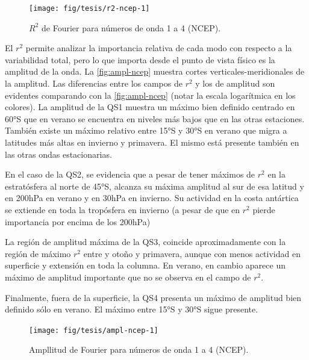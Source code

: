 \documentclass[spanish,a4paper,12pt,oneside]{book}
\begin{document}
\begin{landscape}\begin{figure}

{\centering \texttt{[image: fig/tesis/r2-ncep-1]} 

}

\caption{$R^2$ de Fourier para números de onda 1 a 4 (NCEP).}\label{fig:r2-ncep}
\end{figure}
\end{landscape}

El \(r^2\) permite analizar la importancia relativa de cada modo con
respecto a la variabilidad total, pero lo que importa desde el punto de
vista físico es la amplitud de la onda. La \autoref{fig:ampl-ncep}
muestra cortes verticales-meridionales de la amplitud. Las diferencias
entre los campos de \(r^2\) y los de amplitud son evidentes comparando
con la \autoref{fig:ampl-ncep} (notar la escala logarítmica en los
colores). La amplitud de la QS1 muestra un máximo bien definido centrado
en 60°S que en verano se encuentra en niveles más bajos que en las otras
estaciones. También existe un máximo relativo entre 15°S y 30°S en
verano que migra a latitudes más altas en invierno y primavera. El mismo
está presente también en las otras ondas estacionarias.

En el caso de la QS2, se evidencia que a pesar de tener máximos de
\(r^2\) en la estratósfera al norte de 45°S, alcanza su máxima amplitud
al sur de esa latitud y en 200hPa en verano y en 30hPa en invierno. Su
actividad en la costa antártica se extiende en toda la tropósfera en
invierno (a pesar de que en \(r^2\) pierde importancia por encima de los
200hPa)

La región de amplitud máxima de la QS3, coincide aproximadamente con la
región de máximo \(r^2\) entre y otoño y primavera, aunque con menos
actividad en superficie y extensión en toda la columna. En verano, en
cambio aparece un máximo de amplitud importante que no se observa en el
campo de \(r^2\).

Finalmente, fuera de la superficie, la QS4 presenta un máximo de
amplitud bien definido sólo en verano. El máximo entre 15°S y 30°S sigue
presente.

\begin{landscape}\begin{figure}

{\centering \texttt{[image: fig/tesis/ampl-ncep-1]} 

}

\caption{Ampllitud de Fourier para números de onda 1 a 4 (NCEP).}\label{fig:ampl-ncep}
\end{figure}
\end{landscape}
\end{document}
